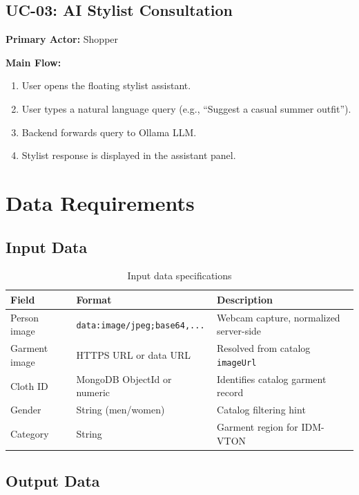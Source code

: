 \subsection{UC-03: AI Stylist Consultation}

\textbf{Primary Actor:} Shopper

\textbf{Main Flow:}
\begin{enumerate}[leftmargin=*]
  \item User opens the floating stylist assistant.
  \item User types a natural language query (e.g., ``Suggest a casual summer outfit'').
  \item Backend forwards query to Ollama LLM.
  \item Stylist response is displayed in the assistant panel.
\end{enumerate}

\section{Data Requirements}
\label{sec:data-requirements}

\subsection{Input Data}

\begin{table}[H]
  \centering
  \caption{Input data specifications}
  \label{tab:input-data}
  \begin{tabular}{@{}llp{7cm}@{}}
    \toprule
    \textbf{Field} & \textbf{Format} & \textbf{Description} \\
    \midrule
    Person image & \texttt{data:image/jpeg;base64,...} & Webcam capture, normalized server-side \\
    Garment image & HTTPS URL or data URL & Resolved from catalog \texttt{imageUrl} \\
    Cloth ID & MongoDB ObjectId or numeric & Identifies catalog garment record \\
    Gender & String (men/women) & Catalog filtering hint \\
    Category & String & Garment region for IDM-VTON \\
    \bottomrule
  \end{tabular}
\end{table}

\subsection{Output Data}


